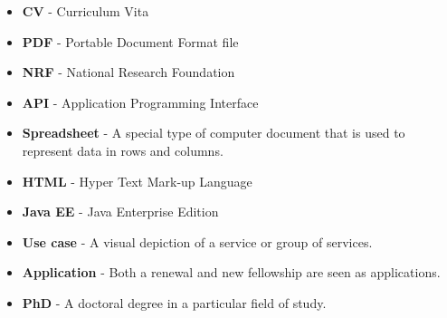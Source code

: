 \documentclass[12pt]{article}
\begin{document}
\begin{itemize}


\item \textbf{CV} - Curriculum Vita
\item \textbf{PDF} - Portable Document Format file
\item \textbf{NRF} - National Research Foundation
\item \textbf{API} - Application Programming Interface
\item \textbf{Spreadsheet} - A special type of computer document that is used to represent data in rows and columns. 
\item \textbf{HTML} - Hyper Text Mark-up Language
\item \textbf{Java EE} - Java Enterprise Edition
\item \textbf{Use case} - A visual depiction of a service or group of services.
\item \textbf{Application} - Both a renewal and new fellowship are seen as applications.
\item \textbf{PhD} - A doctoral degree in a particular field of study. 


\end{itemize}	


\vspace{0.5in}
\end{document}
